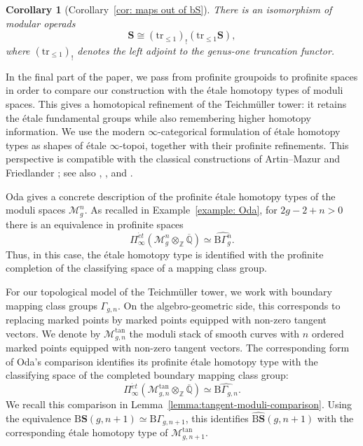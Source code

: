 \documentclass{amsart}
\newcommand{\bS}{\mathbf{S}}
\newcommand{\cs}{\mathrm{B}}
\newcommand{\trun}[1]{\mathrm{tr}_{\leq{#1}}}
\newtheorem*{cor*}{Corollary}%
\theoremstyle{definition}
\numberwithin{equation}{section}
\begin{document}
\begin{cor*}[Corollary~\ref{cor: maps out of bS}]
There is an isomorphism of modular operads
    \[\bS\cong (\trun{1})_!(\trun{1}\bS),\]
where $(\trun{1})_!$ denotes the left adjoint to the genus-one truncation functor.
\end{cor*}

\medskip

In the final part of the paper, we pass from profinite groupoids to profinite spaces in order to compare our construction with the \'etale homotopy types of moduli spaces. This gives a homotopical refinement of the Teichm\"uller tower: it retains the \'etale fundamental groups while also remembering higher homotopy information. We use the modern $\infty$-categorical formulation of \'etale homotopy types as shapes of \'etale $\infty$-topoi, together with their profinite refinements. This perspective is compatible with the classical constructions of Artin--Mazur \cite{Artin_Mazur} and Friedlander \cite{Friedlander}; see also \cite[Definition~7.1.6.1 and Example~7.1.6.9]{Lurie}, \cite{Carchedi}, and \cite{haine2024profinite}.

Oda \cite[Theorem 1]{Oda} gives a concrete description of the profinite \'etale homotopy types of the moduli spaces $\mathcal M_g^n$. As recalled in Example~\ref{example: Oda}, for $2g-2+n>0$ there is an equivalence in profinite spaces
\[
\Pi^{\acute et}_\infty(\mathcal M_g^n\otimes_{\mathbb Z}\overline{\mathbb Q})
\simeq
\widehat{\cs\Gamma_g^n}.
\]
Thus, in this case, the \'etale homotopy type is identified with the profinite completion of the classifying space of a mapping class group.

For our topological model of the Teichm\"uller tower, we work with boundary mapping class groups $\Gamma_{g,n}$. On the algebro-geometric side, this corresponds to replacing marked points by marked points equipped with non-zero tangent vectors. We denote by $\mathcal M_{g,n}^{\tan}$ the moduli stack of smooth curves with $n$ ordered marked points equipped with non-zero tangent vectors. The corresponding form of Oda's comparison identifies its profinite \'etale homotopy type with the classifying space of the completed boundary mapping class group:
\[
\Pi^{\acute et}_\infty(\mathcal M_{g,n}^{\tan}\otimes_{\mathbb Z}\overline{\mathbb Q})
\simeq
\widehat{\cs\Gamma_{g,n}}.
\]
We recall this comparison in Lemma~\ref{lemma:tangent-moduli-comparison}. Using the equivalence $\cs\mathbf S(g,n+1)\simeq \cs\Gamma_{g,n+1}$, this identifies $\widehat{\cs\mathbf S}(g,n+1)$ with the corresponding \'etale homotopy type of $\mathcal M_{g,n+1}^{\tan}$.
\end{document}
